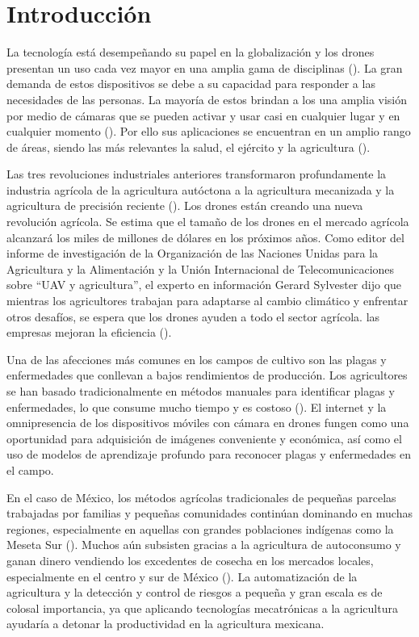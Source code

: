 \documentclass[11pt]{exam}
\begin{document}
    \section{Introducci\'on} \label{sec1}
    La tecnolog\'ia est\'a desempeñando su papel en la globalizaci\'on y los drones presentan un uso cada vez mayor en una amplia gama de disciplinas (\cite{nouacer-2020}). La gran demanda de estos dispositivos se debe a su capacidad para responder a las necesidades de las personas. La mayor\'ia de estos brindan a los una amplia visión por medio de c\'amaras que se pueden activar y usar casi en cualquier lugar y en cualquier momento (\cite{yaacoub-2020}). Por ello sus aplicaciones se encuentran en un amplio rango de áreas, siendo las más relevantes la salud, el ej\'ercito y la agricultura (\cite{ayamga-2021}).

    Las tres revoluciones industriales anteriores transformaron profundamente la industria agr\'icola de la agricultura autóctona a la agricultura mecanizada y la agricultura de precisi\'on reciente (\cite{liu-2020}). Los drones están creando una nueva revolución agr\'icola. Se estima que el tamaño de los drones en el mercado agrícola alcanzar\'a los miles de millones de d\'olares en los pr\'oximos años. Como editor del informe de investigaci\'on de la Organizaci\'on de las Naciones Unidas para la Agricultura y la Alimentación y la Uni\'on Internacional de Telecomunicaciones sobre ``UAV y agricultura'', el experto en informaci\'on Gerard Sylvester dijo que mientras los agricultores trabajan para adaptarse al cambio clim\'atico y enfrentar otros desaf\'ios, se espera que los drones ayuden a todo el sector agr\'icola. las empresas mejoran la eficiencia (\cite{ren-2020}).

    Una de las afecciones más comunes en los campos de cultivo son las plagas y enfermedades que conllevan a bajos rendimientos de producción. Los agricultores se han basado tradicionalmente en métodos manuales para identificar plagas y enfermedades, lo que consume mucho tiempo y es costoso (\cite{xing-2022}). El internet y la omnipresencia de los dispositivos móviles con cámara en drones fungen como una oportunidad para adquisición de imágenes conveniente y económica, así como el uso de modelos de aprendizaje profundo para reconocer plagas y enfermedades en el campo.

    En el caso de M\'exico, los métodos agrícolas tradicionales de pequeñas parcelas trabajadas por familias y pequeñas comunidades contin\'uan dominando en muchas regiones, especialmente en aquellas con grandes poblaciones ind\'igenas como la Meseta Sur (\cite{alvarez-2018}). Muchos a\'un subsisten gracias a la agricultura de autoconsumo y ganan dinero vendiendo los excedentes de cosecha en los mercados locales, especialmente en el centro y sur de México (\cite{negrete-2018}). La automatizaci\'on de la agricultura y la detección y control de riesgos a pequeña y gran escala es de colosal importancia, ya que aplicando tecnolog\'ias mecatr\'onicas a la agricultura ayudar\'ia a detonar la productividad en la agricultura mexicana.
\end{document}
